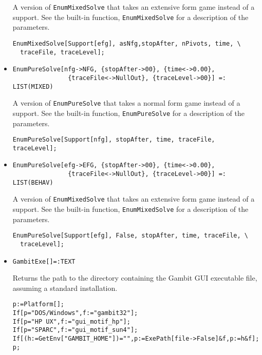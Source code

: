 \begin{itemize}
\bd 
A version of \verb+EnumMixedSolve+ that takes an extensive form game instead
of a support.  See the built-in function, \verb+EnumMixedSolve+ for a
description of the parameters.
\begin{verbatim}
EnumMixedSolve[Support[efg], asNfg,stopAfter, nPivots, time, \
  traceFile, traceLevel];
\end{verbatim} 
\ed

\item{}
\protect \large \begin{verbatim}
EnumPureSolve[nfg->NFG, {stopAfter->00}, {time<->0.00}, 
               {traceFile<->NullOut}, {traceLevel->00}] =: LIST(MIXED)
\end{verbatim}\normalsize

\bd 
A version of \verb+EnumPureSolve+ that takes a normal form game instead
of a support.  See the built-in function, \verb+EnumPureSolve+ for a
description of the parameters.
\begin{verbatim}
EnumPureSolve[Support[nfg], stopAfter, time, traceFile, traceLevel];
\end{verbatim} 
\ed

\item{}
\protect \large \begin{verbatim}
EnumPureSolve[efg->EFG, {stopAfter->00}, {time<->0.00}, 
               {traceFile<->NullOut}, {traceLevel->00}] =: LIST(BEHAV)
\end{verbatim}\normalsize

\bd 
A version of \verb+EnumMixedSolve+ that takes an extensive form
game instead of a support.  See the built-in function,
\verb+EnumMixedSolve+ for a description of the parameters.
\begin{verbatim}
EnumPureSolve[Support[efg], False, stopAfter, time, traceFile, \
  traceLevel];
\end{verbatim} 
\ed

\item{}
\protect \large \begin{verbatim}
GambitExe[]=:TEXT
\end{verbatim}\normalsize

\bd 
Returns the path to the directory containing the Gambit GUI executable
file, assuming a standard installation.  
\begin{verbatim}
p:=Platform[];
If[p="DOS/Windows",f:="gambit32"];
If[p="HP UX",f:="gui_motif_hp"];
If[p="SPARC",f:="gui_motif_sun4"];
If[(h:=GetEnv["GAMBIT_HOME"])="",p:=ExePath[file->False]&f,p:=h&f];
p;
\end{verbatim} 
\ed


\end{itemize}
